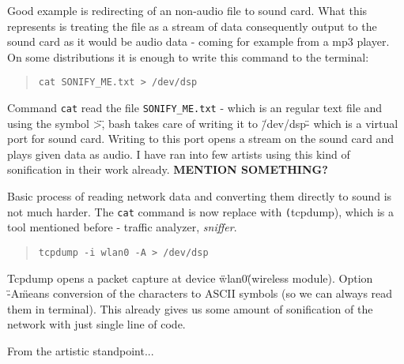 \documentclass[11pt,a4paper,oneside]{report}
\begin{document}
Good example is redirecting of an non-audio file to sound card. What this represents is treating the file as a stream of data consequently output to the sound card as it would be audio data - coming for example from a mp3 player. On some distributions it is enough to write this command to the terminal:

\begin{quotation}
	\texttt{cat SONIFY\_ME.txt > /dev/dsp}
\end{quotation}

Command \texttt{cat} read the file \texttt{SONIFY\_ME.txt} - which is an regular text file and using the symbol \">\", bash takes care of writing it to \"/dev/dsp\" - which is a virtual port for sound card. Writing to this port opens a stream on the sound card and plays given data as audio. I have ran into few artists using this kind of sonification in their work already. \textbf{MENTION SOMETHING?}

Basic process of reading network data and converting them directly to sound is not much harder. The \texttt{cat} command is now replace with \texttt(tcpdump), which is a tool mentioned before - traffic analyzer, \textit{sniffer}.

\begin{quotation}
	\texttt{tcpdump -i wlan0 -A > /dev/dsp}
\end{quotation}

Tcpdump opens a packet capture at device \"wlan0\" (wireless module). Option \"-A\" means conversion of the characters to ASCII symbols (so we can always read them in terminal).
This already gives us some amount of sonification of the network with just single line of code. 


From the artistic standpoint...
\end{document}
